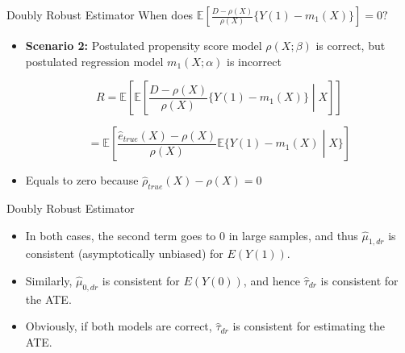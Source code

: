 \documentclass{beamer}
\begin{document}
\begin{frame}{Doubly Robust Estimator}
    When does \( \mathbb{E} \left[ \frac{D - \rho(X)}{\rho(X)} \{Y(1) - m_1(X)\} \right] = 0? \)

    \begin{itemize}
        \item \textbf{Scenario 2:} Postulated propensity score model \( \rho(X; \beta) \) is correct,
        but postulated regression model \( m_1(X; \alpha) \) is incorrect

        \[
        R = \mathbb{E} \left[ \mathbb{E} \left[ \frac{D - \rho(X)}{\rho(X)} \{Y(1) - m_1(X)\} \middle| X \right] \right]
        \]

        \[
        = \mathbb{E} \left[ \frac{\hat{e}_{true}(X) - \rho(X)}{\rho(X)} \mathbb{E} \{Y(1) - m_1(X) \middle| X\} \right]
        \]

        \item Equals to zero because \( \hat{\rho}_{true}(X) - \rho(X) = 0 \)
    \end{itemize}
\end{frame}




\begin{frame}{Doubly Robust Estimator}
    \begin{itemize}
        \item In both cases, the second term goes to 0 in large samples, and
        thus \( \hat{\mu}_{1,dr} \) is consistent (asymptotically unbiased) for \( E(Y(1)) \).
        \item Similarly, \( \hat{\mu}_{0,dr} \) is consistent for \( E(Y(0)) \), and hence \( \hat{\tau}_{dr} \)
        is consistent for the ATE.
        \item Obviously, if both models are correct, \( \hat{\tau}_{dr} \) is consistent for
        estimating the ATE.
    \end{itemize}
\end{frame}
\end{document}
